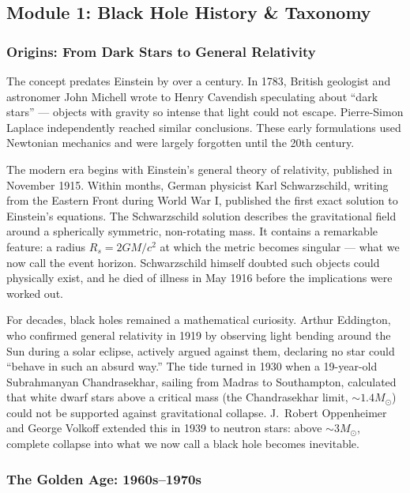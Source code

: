 \documentclass[11pt,letterpaper]{article}
\begin{document}
\subsection{Module 1: Black Hole History \& Taxonomy}

\subsubsection{Origins: From Dark Stars to General Relativity}

The concept predates Einstein by over a century. In 1783, British geologist and astronomer John Michell wrote to Henry Cavendish speculating about ``dark stars'' --- objects with gravity so intense that light could not escape. Pierre-Simon Laplace independently reached similar conclusions. These early formulations used Newtonian mechanics and were largely forgotten until the 20th century.

The modern era begins with Einstein's general theory of relativity, published in November 1915. Within months, German physicist Karl Schwarzschild, writing from the Eastern Front during World War I, published the first exact solution to Einstein's equations. The Schwarzschild solution describes the gravitational field around a spherically symmetric, non-rotating mass. It contains a remarkable feature: a radius $R_s = 2GM/c^2$ at which the metric becomes singular --- what we now call the event horizon. Schwarzschild himself doubted such objects could physically exist, and he died of illness in May 1916 before the implications were worked out.

For decades, black holes remained a mathematical curiosity. Arthur Eddington, who confirmed general relativity in 1919 by observing light bending around the Sun during a solar eclipse, actively argued against them, declaring no star could ``behave in such an absurd way.'' The tide turned in 1930 when a 19-year-old Subrahmanyan Chandrasekhar, sailing from Madras to Southampton, calculated that white dwarf stars above a critical mass (the Chandrasekhar limit, $\sim 1.4 M_\odot$) could not be supported against gravitational collapse. J.\ Robert Oppenheimer and George Volkoff extended this in 1939 to neutron stars: above $\sim 3 M_\odot$, complete collapse into what we now call a black hole becomes inevitable.

\subsubsection{The Golden Age: 1960s--1970s}
\end{document}
